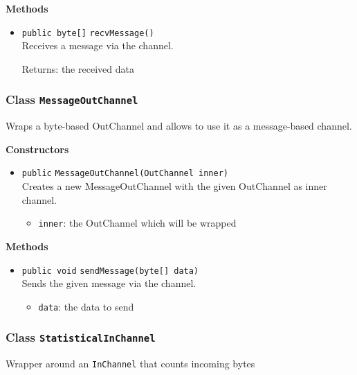 \textbf{Methods}
\begin{itemize}
\item \lstinline|public byte[]| \lstinline|recvMessage|\lstinline|()|\\
Receives a message via the channel.

Returns: the received data

\end{itemize}

\subsubsection{Class \lstinline|MessageOutChannel|}
Wraps a byte-based OutChannel and allows to use it as a message-based
 channel. \\





\textbf{Constructors}
\begin{itemize}
\item \lstinline|public| \lstinline|MessageOutChannel|\lstinline|(OutChannel inner)|\\
Creates a new MessageOutChannel with the given OutChannel as inner channel.
\begin{itemize}
\item \lstinline|inner|: the OutChannel which will be wrapped
\end{itemize}



\end{itemize}


\textbf{Methods}
\begin{itemize}
\item \lstinline|public void| \lstinline|sendMessage|\lstinline|(byte[] data)|\\
Sends the given message via the channel.
\begin{itemize}
\item \lstinline|data|: the data to send
\end{itemize}



\end{itemize}

\subsubsection{Class \lstinline|StatisticalInChannel|}
Wrapper around an \lstinline|InChannel| that counts incoming bytes \\



